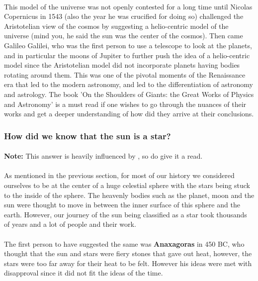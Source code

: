\documentclass[a4paper,twoside]{article}
\numberwithin{equation}{section}
\begin{document}
\paragraph{}
This model of the universe was not openly contested for a long time until Nicolas Copernicus in 1543 (also the year he was crucified for doing so) challenged the Aristotelian view of the cosmos by suggesting a helio-centric model of the universe (mind you, he said the sun was the center of the cosmos). Then came Galileo Galilei, who was the first person to use a telescope to look at the planets, and in particular the moons of Jupiter to further push the idea of a helio-centric model since the Aristotelian model did not incorporate planets having bodies rotating around them. This  was one of the pivotal moments of the Renaissance era that led to the modern astronomy, and led to the differentiation of astronomy and astrology. The book 'On the Shoulders of Giants: the Great Works of Physics and Astronomy' \cite{OTSOG} is a must read if one wishes to go through the nuances of their works and get a deeper understanding of how did they arrive at their conclusions. 

\subsubsection{How did we know that the sun is a star?}
\paragraph{}
\textbf{Note:} This answer is heavily influenced by \cite{AASP}, so do give it a read.
\paragraph{}
As mentioned in the previous section, for most of our history we considered ourselves to be at the center of a huge celestial sphere with the stars being stuck to the inside of the sphere. The heavenly bodies such as the planet, moon and the sun were thought to move in between the inner surface of this sphere and the earth. However, our journey of the sun being classified as a star took thousands of years and a lot of people and their work. 
\paragraph{}
The first person to have suggested the same was \textbf{Anaxagoras} in 450 BC, who thought that the sun and stars were fiery stones that gave out heat, however, the stars were too far away for their heat to be felt. However his ideas were met with disapproval since it did not fit the ideas of the time. 
\end{document}
